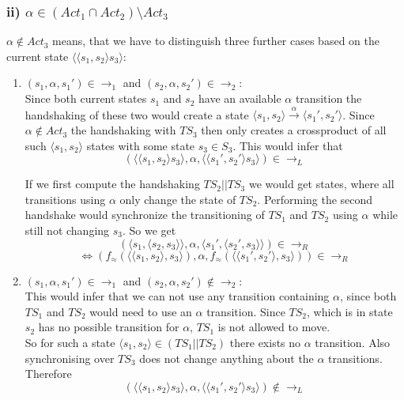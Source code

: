 \documentclass[11pt]{article}
\begin{document}
	\subsubsection*{ii) $\alpha \in (Act_1 \cap Act_2) \setminus Act_3$}
	$\alpha \notin Act_3$ means, that we have to distinguish three further cases based on the current state $\langle \langle s_1 , s_2 \rangle s_3 \rangle$:
	\begin{enumerate}
		\item $(s_1,\alpha, s_1')\in \rightarrow_1$ and $(s_2,\alpha, s_2')\in \rightarrow_2$:\\
		Since both current states $s_1$ and $s_2$ have an available $\alpha$ transition the handshaking of these two would create a state $\langle s_1, s_2 \rangle \xrightarrow{\alpha} \langle s_1', s_2' \rangle$. Since $\alpha \notin Act_3$ the handshaking with $TS_3$ then only creates a crossproduct of all such $\langle s_1, s_2 \rangle$ states with some state $s_3\in S_3$. This would infer that
		$$ (\langle \langle s_1 , s_2 \rangle s_3 \rangle, \alpha, \langle \langle s_1' , s_2' \rangle s_3 \rangle) \in \rightarrow_L$$
		
		If we first compute the handshaking $TS_2 || TS_3$ we would get states, where all transitions using $\alpha$ only change the state of $TS_2$. Performing the second handshake would synchronize the transitioning of $TS_1$ and $TS_2$ using $\alpha$ while still not changing $s_3$. So we get
		$$(\langle s_1 , \langle s_2 , s_3 \rangle \rangle,\alpha, \langle s_1' , \langle s_2' , s_3 \rangle \rangle)\in \rightarrow_R$$
		$$\Leftrightarrow(f_\approx(\langle \langle s_1 , s_2 \rangle, s_3 \rangle),\alpha, f_\approx(\langle \langle s_1' , s_2' \rangle, s_3 \rangle))\in \rightarrow_R$$
		
		\item $(s_1,\alpha, s_1')\in \rightarrow_1$ and $(s_2,\alpha, s_2')\notin \rightarrow_2$:\\
		This would infer that we can not use any transition containing $\alpha$, since both $TS_1$ and $TS_2$ would need to use an $\alpha$ transition. Since $TS_2$, which is in state $s_2$ has no possible transition for $\alpha$, $TS_1$ is not allowed to move.\\
		So for such a state $\langle s_1, s_2 \rangle \in (TS_1 || TS_2)$ there exists no $\alpha$ transition. Also synchronising over $TS_3$ does not change anything about the $\alpha$ transitions. Therefore
		$$(\langle \langle s_1 , s_2 \rangle s_3 \rangle, \alpha, \langle \langle s_1' , s_2' \rangle s_3 \rangle) \notin \rightarrow_L$$
		

\end{enumerate}
\end{document}
